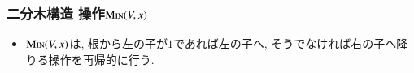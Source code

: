 \documentclass[main]{subfiles}
\begin{document}
\begin{frame}\frametitle{二分木構造 操作$\mathrm{\text{M\textsc{in}}}(V,x)$}
\begin{itemize}
\item $\mathrm{\text{M\textsc{in}}}(V,x)$は, 根から左の子が$1$であれば左の子へ, そうでなければ右の子へ降りる操作を再帰的に行う.
\end{itemize}


\end{frame}
\end{document}
